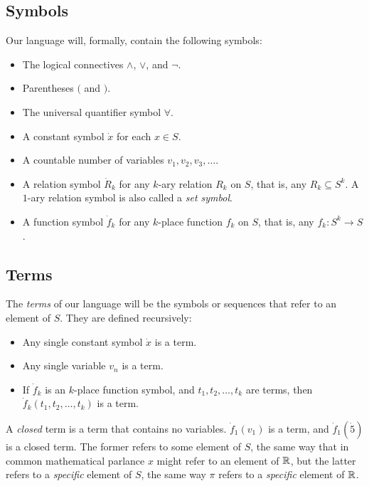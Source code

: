 \subsection{Symbols}
Our language will, formally, contain the following symbols:
\begin{itemize}
    \item The logical connectives $\land$, $\lor$, and $\neg$.
    \item Parentheses $($ and $)$.
    \item The universal quantifier symbol $\forall$.
    \item A constant symbol $\dot x$ for each $x \in S$.
    \item A countable number of variables $v_1, v_2, v_3, \ldots$.
    \item A relation symbol $\dot R_k$ for any $k$-ary relation $R_k$ on $S$, that is, any $R_k \subseteq S^k$. A $1$-ary relation symbol is also called a \textit{set symbol}.
    \item A function symbol $\dot f_k$ for any $k$-place function $f_k$ on $S$, that is, any $f_k : S^k \to S$.
\end{itemize}

\subsection{Terms}
The \textit{terms} of our language will be the symbols or sequences that refer to an element of $S$. They are defined recursively:
\begin{itemize}
    \item Any single constant symbol $\dot x$ is a term.
    \item Any single variable $v_n$ is a term.
    \item If $\dot f_k$ is an $k$-place function symbol, and $t_1, t_2, \ldots, t_k$ are terms, then $\dot f_k (t_1, t_2, \ldots, t_k)$ is a term.
\end{itemize}
A \textit{closed} term is a term that contains no variables. $\dot f_1 (v_1)$ is a term, and $\dot f_1 (\dot 5)$ is a closed term. The former refers to some element of $S$, the same way that in common mathematical parlance $x$ might refer to an element of $\mathbb{R}$, but the latter refers to a \textit{specific} element of $S$, the same way $\pi$ refers to a \textit{specific} element of $\mathbb{R}$.

